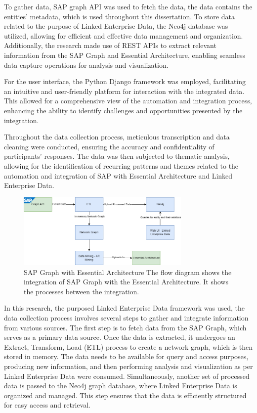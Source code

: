 \documentclass{article}
\begin{document}
To gather data, SAP graph API was used to fetch the data, the data contains the entities' metadata, which is used throughout this dissertation. To store data related to the purpose of Linked Enterprise Data, the Neo4j database was utilized, allowing for efficient and effective data management and organization. Additionally, the research made use of REST APIs to extract relevant information from the SAP Graph and Essential Architecture, enabling seamless data capture operations for analysis and visualization.

For the user interface, the Python Django framework was employed, facilitating an intuitive and user-friendly platform for interaction with the integrated data. This allowed for a comprehensive view of the automation and integration process, enhancing the ability to identify challenges and opportunities presented by the integration.

Throughout the data collection process, meticulous transcription and data cleaning were conducted, ensuring the accuracy and confidentiality of participants' responses. The data was then subjected to thematic analysis, allowing for the identification of recurring patterns and themes related to the automation and integration of SAP with Essential Architecture and Linked Enterprise Data.

\begin{figure}[ht!]
    \centering
    \includegraphics[width=0.75\textwidth]{techique-overview}
    \caption{SAP Graph with Essential Architecture
The flow diagram shows the integration of SAP Graph with the Essential Architecture. It shows the processes between the integration.}
    \label{fig: technique overview}
\end{figure}

In this research, the purposed Linked Enterprise Data framework was used, the data collection process involves several steps to gather and integrate information from various sources. The first step is to fetch data from the SAP Graph, which serves as a primary data source. Once the data is extracted, it undergoes an Extract, Transform, Load (ETL) process to create a network graph, which is then stored in memory. The data needs to be available for query and access purposes, producing new information, and then performing analysis and visualization as per Linked Enterprise Data were consumed. Simultaneously, another set of processed data is passed to the Neo4j graph database, where Linked Enterprise Data is organized and managed. This step ensures that the data is efficiently structured for easy access and retrieval.
\end{document}

